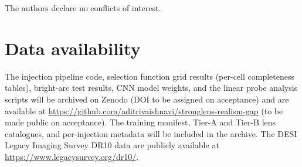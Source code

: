 \documentclass[fleqn,usenatbib]{mnras}
\begin{document}
The authors declare no conflicts of interest.

\section*{Data availability}
The injection pipeline code, selection function grid results (per-cell completeness tables), bright-arc test results, CNN model weights, and the linear probe analysis scripts will be archived on Zenodo (DOI to be assigned on acceptance) and are available at \url{https://github.com/aditrivaishnavi/stronglens-realism-gap} (to be made public on acceptance).  The training manifest, Tier-A and Tier-B lens catalogues, and per-injection metadata will be included in the archive.  The DESI Legacy Imaging Survey DR10 data are publicly available at \url{https://www.legacysurvey.org/dr10/}.
\end{document}
